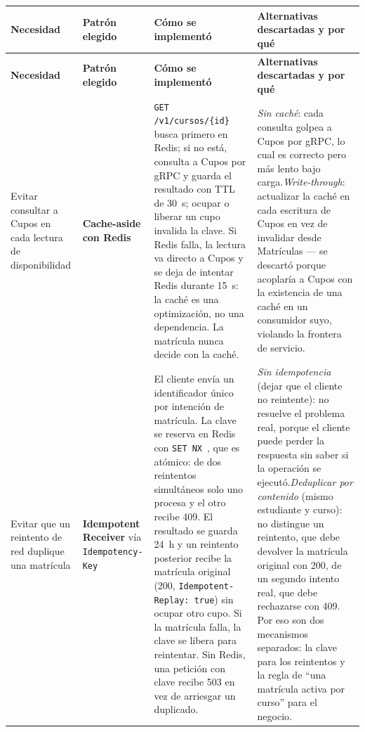 \documentclass[11pt,spanish]{article}
\begin{document}
\begin{xltabular}{\textwidth}{p{2.4cm} p{2.4cm} X X}
\toprule
\textbf{Necesidad} & \textbf{Patrón elegido} & \textbf{Cómo se implementó} & \textbf{Alternativas descartadas y por qué} \\
\midrule
\endfirsthead
\toprule
\textbf{Necesidad} & \textbf{Patrón elegido} & \textbf{Cómo se implementó} & \textbf{Alternativas descartadas y por qué} \\
\midrule
\endhead
\bottomrule
\endfoot
Evitar consultar a Cupos en cada lectura de disponibilidad & \textbf{Cache-aside con Redis} & \texttt{GET /v1/cursos/\{id\}} busca primero en Redis; si no está, consulta a Cupos por gRPC y guarda el resultado con TTL de 30~s; ocupar o liberar un cupo invalida la clave. Si Redis falla, la lectura va directo a Cupos y se deja de intentar Redis durante 15~s: la caché es una optimización, no una dependencia. La matrícula nunca decide con la caché. & \textit{Sin caché}: cada consulta golpea a Cupos por gRPC, lo cual es correcto pero más lento bajo carga.\newline \textit{Write-through}: actualizar la caché en cada escritura de Cupos en vez de invalidar desde Matrículas — se descartó porque acoplaría a Cupos con la existencia de una caché en un consumidor suyo, violando la frontera de servicio. \\
\addlinespace
Evitar que un reintento de red duplique una matrícula & \textbf{Idempotent Receiver} vía \texttt{Idempotency-\allowbreak Key} & El cliente envía un identificador único por intención de matrícula. La clave se reserva en Redis con \texttt{SET NX}~\cite{redisset}, que es atómico: de dos reintentos simultáneos solo uno procesa y el otro recibe 409. El resultado se guarda 24~h y un reintento posterior recibe la matrícula original (200, \texttt{Idempotent-Replay: true}) sin ocupar otro cupo. Si la matrícula falla, la clave se libera para reintentar. Sin Redis, una petición con clave recibe 503 en vez de arriesgar un duplicado. & \textit{Sin idempotencia} (dejar que el cliente no reintente): no resuelve el problema real, porque el cliente puede perder la respuesta sin saber si la operación se ejecutó.\newline \textit{Deduplicar por contenido} (mismo estudiante y curso): no distingue un reintento, que debe devolver la matrícula original con 200, de un segundo intento real, que debe rechazarse con 409. Por eso son dos mecanismos separados: la clave para los reintentos y la regla de ``una matrícula activa por curso'' para el negocio. \\

\end{xltabular}
\end{document}
